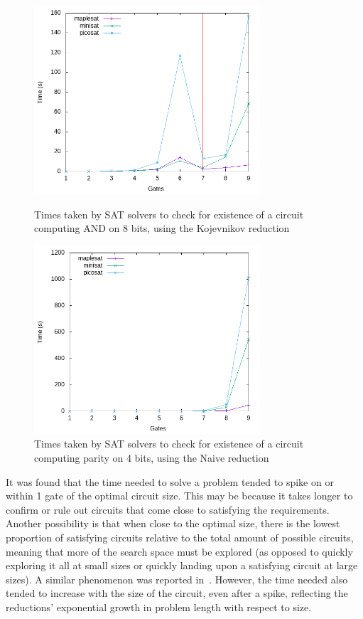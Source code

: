 \documentclass{article}
\begin{document}
\begin{figure}[h!]
  \centering
  \includegraphics[width=0.75\textwidth]{images/times/8and_kulikov.png}
  \caption{Times taken by SAT solvers to check for existence of a circuit computing AND on 8 bits, using the Kojevnikov reduction\label{fig:8and_kulikov}}
  \includegraphics[width=0.75\textwidth]{images/times/4parity_naive.png}
  \caption{Times taken by SAT solvers to check for existence of a circuit computing parity on 4 bits, using the Naive reduction\label{fig:4parity_naive}}
\end{figure}

It was found that the time needed to solve a problem tended to spike on or within 1 gate of the optimal circuit size. This may be because it takes longer to confirm or rule out circuits that come close to satisfying the requirements. Another possibility is that when close to the optimal size, there is the lowest proportion of satisfying circuits relative to the total amount of possible circuits, meaning that more of the search space must be explored (as opposed to quickly exploring it all at small sizes or quickly landing upon a satisfying circuit at large sizes). A similar phenomenon was reported in~\cite{estrada}. However, the time needed also tended to increase with the size of the circuit, even after a spike, reflecting the reductions' exponential growth in problem length with respect to size.
\end{document}
